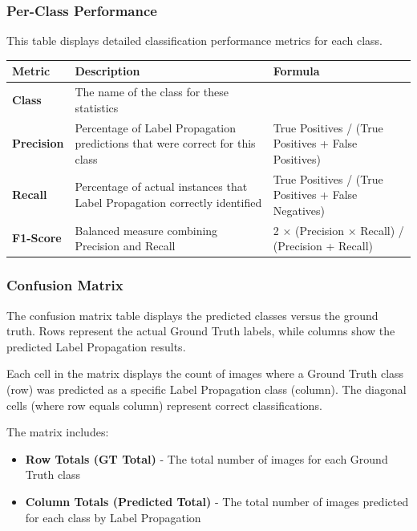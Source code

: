 \documentclass[
  11pt,
  a4paper,
  11pt,
  oneside]{report}
\providecommand{\tightlist}{%
  \setlength{\itemsep}{0pt}\setlength{\parskip}{0pt}}
\begin{document}
\subsubsection{Per-Class Performance}\label{per-class-performance}

This table displays detailed classification performance metrics for each
class.

\begin{tabularx}{\textwidth}{|p{}|X|p{}|}
\hline
\textbf{Metric} & \textbf{Description} & \textbf{Formula} \\
\hline
\textbf{Class} & The name of the class for these statistics &  \\
\hline
\textbf{Precision} & Percentage of Label Propagation predictions that were correct for this class & True Positives / (True Positives + False Positives) \\
\hline
\textbf{Recall} & Percentage of actual instances that Label Propagation correctly identified & True Positives / (True Positives + False Negatives) \\
\hline
\textbf{F1-Score} & Balanced measure combining Precision and Recall & 2 × (Precision × Recall) / (Precision + Recall) \\
\hline
\end{tabularx}

\subsubsection{Confusion Matrix}\label{confusion-matrix}

The confusion matrix table displays the predicted classes versus the
ground truth. Rows represent the actual Ground Truth labels, while
columns show the predicted Label Propagation results.

Each cell in the matrix displays the count of images where a Ground
Truth class (row) was predicted as a specific Label Propagation class
(column). The diagonal cells (where row equals column) represent correct
classifications.

The matrix includes:

\begin{itemize}
\tightlist
\item
  \textbf{Row Totals (GT Total)} - The total number of images for each
  Ground Truth class
\item
  \textbf{Column Totals (Predicted Total)} - The total number of images
  predicted for each class by Label Propagation
\end{itemize}
\end{document}

